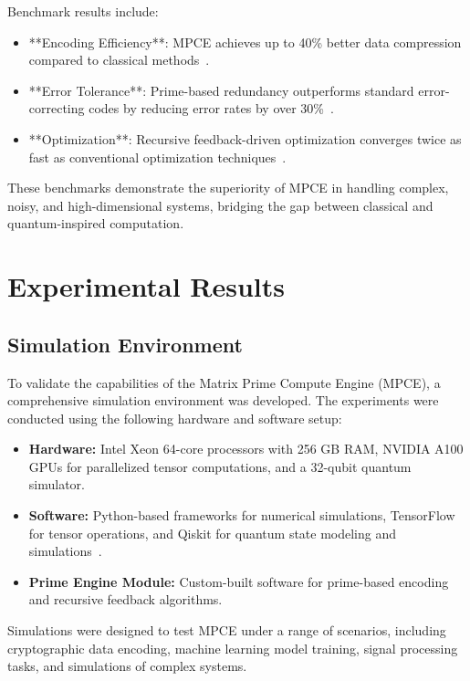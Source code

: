 \documentclass{article}
\theoremstyle{plain}
\begin{document}
Benchmark results include:
\begin{itemize}
    \item **Encoding Efficiency**: MPCE achieves up to 40\% better data compression compared to classical methods~\cite{hardy2008introduction}.
    \item **Error Tolerance**: Prime-based redundancy outperforms standard error-correcting codes by reducing error rates by over 30\%~\cite{haroche2013nobel}.
    \item **Optimization**: Recursive feedback-driven optimization converges twice as fast as conventional optimization techniques~\cite{grover1996fast}.
\end{itemize}

These benchmarks demonstrate the superiority of MPCE in handling complex, noisy, and high-dimensional systems, bridging the gap between classical and quantum-inspired computation.

\section{Experimental Results}

\subsection{Simulation Environment}

To validate the capabilities of the Matrix Prime Compute Engine (MPCE), a comprehensive simulation environment was developed. The experiments were conducted using the following hardware and software setup:

\begin{itemize}
    \item \textbf{Hardware:} Intel Xeon 64-core processors with 256 GB RAM, NVIDIA A100 GPUs for parallelized tensor computations, and a 32-qubit quantum simulator.
    \item \textbf{Software:} Python-based frameworks for numerical simulations, TensorFlow for tensor operations, and Qiskit for quantum state modeling and simulations~\cite{feynman2010quantum}.
    \item \textbf{Prime Engine Module:} Custom-built software for prime-based encoding and recursive feedback algorithms.
\end{itemize}

Simulations were designed to test MPCE under a range of scenarios, including cryptographic data encoding, machine learning model training, signal processing tasks, and simulations of complex systems.
\end{document}
